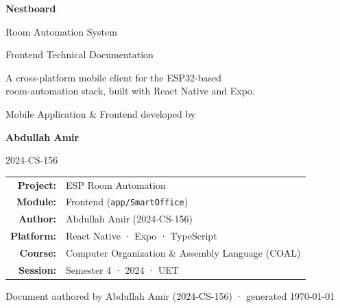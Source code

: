 \documentclass[11pt,a4paper]{article}
\begin{document}
\begin{titlepage}
  \centering
  \vspace*{2cm}
  {\color{accent}\Huge\bfseries Nestboard\par}
  \vspace{0.4cm}
  {\Large Room Automation System\par}
  \vspace{0.3cm}
  {\large\color{muted} Frontend Technical Documentation\par}
  \vspace{2cm}

  \begin{tcolorbox}[colback=codebg,colframe=accent,width=0.75\textwidth,
      arc=4pt,boxrule=1pt]
    \centering
    \large
    A cross-platform mobile client for the ESP32-based\\
    room-automation stack, built with React Native and Expo.
  \end{tcolorbox}

  \vspace{1.2cm}
  {\large Mobile Application \& Frontend developed by\par}
  \vspace{0.3cm}
  {\color{accent}\LARGE\bfseries Abdullah Amir\par}
  \vspace{0.15cm}
  {\large\color{muted} 2024-CS-156\par}

  \vfill

  \begin{tabular}{rl}
    \textbf{Project:}     & ESP Room Automation \\
    \textbf{Module:}      & Frontend (\texttt{app/SmartOffice}) \\
    \textbf{Author:}      & Abdullah Amir (2024-CS-156) \\
    \textbf{Platform:}    & React Native · Expo · TypeScript \\
    \textbf{Course:}      & Computer Organization \& Assembly Language (COAL) \\
    \textbf{Session:}     & Semester 4 · 2024 · UET \\
  \end{tabular}

  \vspace{1.5cm}
  {\color{muted}\small Document authored by Abdullah Amir (2024-CS-156) · generated \today}
\end{titlepage}
\end{document}

